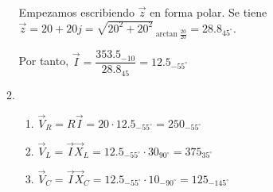 \begin{enumerate}[label=\color{red}\textbf{\arabic*)}, leftmargin=*]
\begin{enumerate}[label=\color{red}\alph*)]
	Empezamos escribiendo $\vec{z}$ en forma polar. Se tiene $\vec{z}=20+20j=\sqrt{20^2+20^2}_{\arctan\frac{20}{20}}=28.8_{45^\circ}$.
	
	Por tanto, $\vec{I}=\dfrac{353.5_{-10}}{28.8_{45}}=12.5_{-55^\circ}$
	\item {}
	\begin{enumerate}[label=\color{red}\roman*)]
		\item {}
		
		$\vec{V}_R=R\vec{I}=20\cdot12.5_{-55^\circ}=250_{-55^\circ}$
		\item {}
		
		$\vec{V}_L=\vec{I}\vec{X}_L=12.5_{-55^\circ}\cdot30_{90^\circ}=375_{35^\circ}$
		\item {}
		
		$\vec{V}_C=\vec{I}\vec{X}_C=12.5_{-55^\circ}\cdot10_{-90^\circ}=125_{-145^\circ}$
	\end{enumerate}
\end{enumerate}
\end{enumerate}

